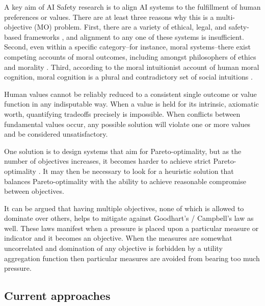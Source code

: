 

A key aim of AI Safety research is to align AI systems to the fulfillment of human preferences \cite{Bostrom2014, russell2019human} or values. There are at least three reasons why this is a multi-objective (MO) problem. First, there are a variety of ethical, legal, and safety-based frameworks \cite{vamplew_human-aligned_2018}, and alignment to any one of these systems is insufficient. Second, even within a specific category--for instance, moral systems--there exist competing accounts of moral outcomes, including amongst philosophers of ethics and morality \cite{bogosian_implementation_2017}. Third, according to the moral intuitionist account of human moral cognition, moral cognition is a plural and contradictory set of social intuitions \cite{haidt2001emotional,sotala2016defining}.

Human values cannot be reliably reduced to a consistent single outcome or value function in any indisputable way. When a value is held for its intrinsic, axiomatic worth, quantifying tradeoffs precisely is impossible. When conflicts between fundamental values occur, any possible solution will violate one or more values and be considered unsatisfactory.  

One solution is to design systems that aim for Pareto-optimality, but as the number of objectives increases, it becomes harder to achieve strict Pareto-optimality \cite{rolf_need_2020}. It may then be necessary to look for a heuristic solution that balances Pareto-optimality with the ability to achieve reasonable compromise between objectives. %

It can be argued that having multiple objectives, none of which is allowed to dominate over others, helps to mitigate against Goodhart's / Campbell's law as well. These laws manifest when a pressure is placed upon a particular measure or indicator and it becomes an objective. When the measures are somewhat uncorrelated and domination of any objective is forbidden by a utility aggregation function then particular measures are avoided from bearing too much pressure.

\subsection{Current approaches}

